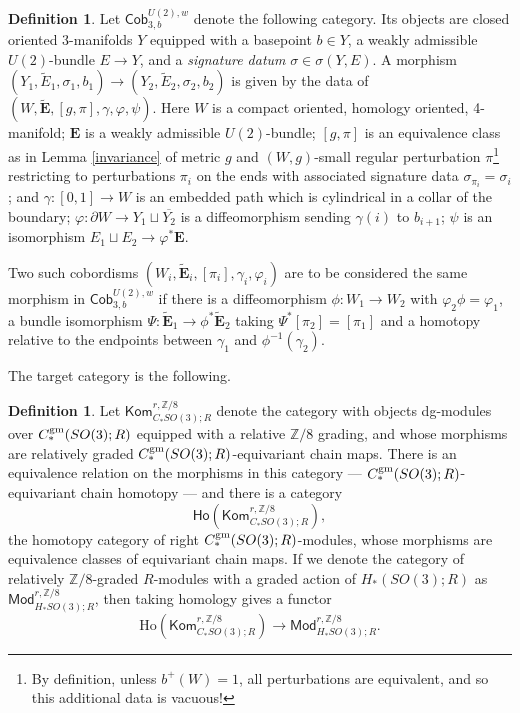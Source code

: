 \documentclass[10pt,a4paper]{amsart}
\theoremstyle{definition}
\newtheorem{definition}[theorem]{Definition}
\theoremstyle{remark}
\numberwithin{figure}{qchap}
\begin{document}
\begin{definition}
Let $\mathsf{Cob}_{3,b}^{U(2),w}$ denote the following category. Its objects are closed oriented 3-manifolds $Y$ equipped with a basepoint $b \in Y$, a weakly admissible $U(2)$-bundle $E \to Y$, and a \emph{signature datum} $\sigma \in \sigma(Y,E)$. A morphism $(Y_1, \tilde E_1, \sigma_1, b_1) \to (Y_2, \tilde E_2, \sigma_2, b_2)$ is given by the data of $(W, \widetilde{\mathbf{E}}, [g,\pi],\gamma, \varphi,\psi)$. Here $W$ is a compact oriented, homology oriented, 4-manifold; $\mathbf{E}$ is a weakly admissible $U(2)$-bundle; $[g,\pi]$ is an equivalence class as in Lemma \ref{invariance} of metric $g$ and $(W,g)$-small regular perturbation $\pi$\footnote{By definition, unless $b^+(W) = 1$, all perturbations are equivalent, and so this additional data is vacuous!} restricting to perturbations $\pi_i$ on the ends with associated signature data $\sigma_{\pi_i} = \sigma_i$; and $\gamma: [0,1] \to W$ is an embedded path which is cylindrical in a collar of the boundary; $\varphi: \partial W \to Y_1 \sqcup \overline{Y_2}$ is a diffeomorphism sending $\gamma(i)$ to $b_{i+1}$; $\psi$ is an isomorphism $E_1 \sqcup E_2 \to \varphi^*\mathbf{E}$.

Two such cobordisms $(W_i, \widetilde{\mathbf{E}}_i, [\pi_i], \gamma_i, \varphi_i)$ are to be considered the same morphism in $\mathsf{Cob}_{3,b}^{U(2),w}$ if there is a diffeomorphism $\phi: W_1 \to W_2$ with $\varphi_2 \phi = \varphi_1$, a bundle isomorphism $\Psi: \widetilde{\mathbf{E}}_1 \to \phi^*\widetilde{\mathbf{E}}_2$ taking $\Psi^*[\pi_2] = [\pi_1]$ and a homotopy relative to the endpoints between $\gamma_1$ and $\phi^{-1}(\gamma_2)$.
\end{definition}
\noindent
The target category is the following.

\begin{definition}Let $\mathsf{Kom}_{C_*SO(3);R}^{r,\mathbb Z/8}$ denote the category with objects dg-modules over $C_*^{\textup{gm}}(SO(3);R)$ equipped with a relative $\mathbb Z/8$ grading, and whose morphisms are relatively graded $C_*^{\textup{gm}}(SO(3);R)$-equivariant chain maps. There is an equivalence relation on the morphisms in this category --- $C_*^{\textup{gm}}(SO(3);R)$-equivariant chain homotopy --- and there is a category $$\mathsf{Ho}\left(\mathsf{Kom}_{C_*SO(3);R}^{r,\mathbb Z/8}\right),$$ the homotopy category of right $C_*^{\textup{gm}}(SO(3);R)$-modules, whose morphisms are equivalence classes of equivariant chain maps. If we denote the category of relatively $\mathbb Z/8$-graded $R$-modules with a graded action of $H_*(SO(3);R)$ as $\mathsf{Mod}^{r,\mathbb Z/8}_{H_*SO(3);R}$, then taking homology gives a functor $$\mathrm{Ho}\left(\mathsf{Kom}_{C_*SO(3);R}^{r,\mathbb Z/8}\right) \to \mathsf{Mod}^{r,\mathbb Z/8}_{H_*SO(3);R}.$$
\end{definition}
\end{document}
